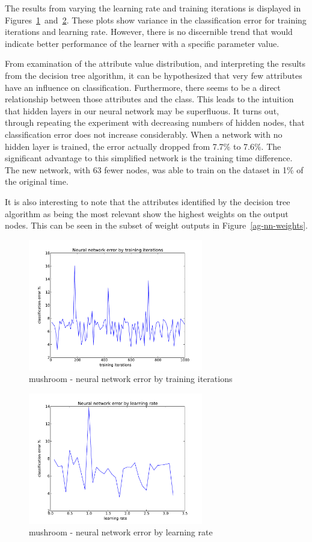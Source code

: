 \documentclass{sig-alternate}
\begin{document}
The results from varying the learning rate and training iterations  is displayed in Figures~\ref{ag-nn-ti}~and~\ref{ag-nn-lr}. These plots show variance in the classification error for training iterations and learning rate. However, there is no discernible trend that would indicate better performance of the learner with a specific parameter value.

From examination of the attribute value distribution, and interpreting the results from the decision tree algorithm, it can be hypothesized that very few attributes have an influence on classification. Furthermore, there seems to be a direct relationship between those attributes and the class. This leads to the intuition that hidden layers in our neural network may be superfluous. It turns out, through repeating the experiment with decreasing numbers of hidden nodes, that classification error does not increase considerably. When a network with no hidden layer is trained, the error actually dropped from 7.7\% to 7.6\%. The significant advantage to this simplified network is the training time difference. The new network, with 63 fewer nodes, was able to train on the dataset in 1\% of the original time.

It is also interesting to note that the attributes identified by the decision tree algorithm as being the most relevant show the highest weights on the output nodes. This can be seen in the subset of weight outputs in Figure~\ref{ag-nn-weights}.


\begin{figure}[!htbp]
    \centering
    \includegraphics[width=3in]{data/agaricus-lepiota/perceptron/training-iterations.pdf}
    \caption{mushroom - neural network error by training iterations \label{ag-nn-ti}}
\end{figure} 

\begin{figure}[!htbp]
    \centering
    \includegraphics[width=3in]{data/agaricus-lepiota/perceptron/learning-rate.pdf}
    \caption{mushroom - neural network error by learning rate \label{ag-nn-lr}}
\end{figure} 
\end{document}
